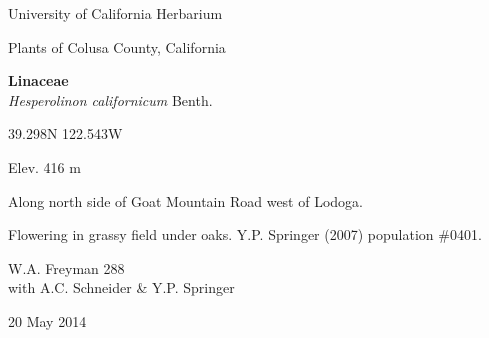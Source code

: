 \documentclass[letterpaper,10pt]{article}
\begin{document}
\begin{minipage}[t]{0.40\textwidth}

\begin{center}
University of California Herbarium \\
\begin{large}
Plants of Colusa County, California \\
\end{large}
\vspace{\baselineskip}
\textbf{Linaceae} \\
\textit{Hesperolinon californicum} Benth.\\
\end{center}

\begin{footnotesize}

\begin{multicols}{2}
39.298\textdegree N 122.543\textdegree W
\columnbreak
\begin{flushright}
Elev. 416 m
\end{flushright}
\end{multicols}

Along north side of Goat Mountain Road west of Lodoga.
\vspace{\baselineskip}

Flowering in grassy field under oaks. Y.P. Springer (2007) population \#0401.

\begin{multicols}{2}
W.A. Freyman 288 \\
with A.C. Schneider \& Y.P. Springer
\columnbreak
\begin{flushright}
20 May 2014
\end{flushright}
\end{multicols}

\end{footnotesize}

\end{minipage}
%
\hspace{2cm}
%
\end{document}
